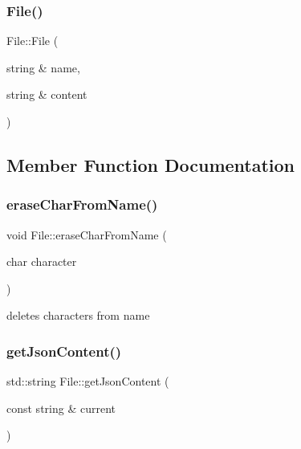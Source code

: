 \subsubsection{\texorpdfstring{File()}{File()}}
{\footnotesize\ttfamily File\+::\+File (\begin{DoxyParamCaption}\item[{string \&}]{name,  }\item[{string \&}]{content }\end{DoxyParamCaption})\hspace{0.3cm}{\ttfamily [inline]}}



\subsection{Member Function Documentation}
\mbox{\label{class_file_aef2ef41308caf6124548ed6421b91188}} 
\subsubsection{\texorpdfstring{erase\+Char\+From\+Name()}{eraseCharFromName()}}
{\footnotesize\ttfamily void File\+::erase\+Char\+From\+Name (\begin{DoxyParamCaption}\item[{char}]{character }\end{DoxyParamCaption})\hspace{0.3cm}{\ttfamily [inline]}}



deletes characters from name 

\mbox{\label{class_file_afaee512326a13dc99d6b8d08522eabe8}} 
\subsubsection{\texorpdfstring{get\+Json\+Content()}{getJsonContent()}}
{\footnotesize\ttfamily std\+::string File\+::get\+Json\+Content (\begin{DoxyParamCaption}\item[{const string \&}]{current }\end{DoxyParamCaption})}



